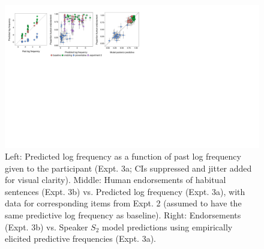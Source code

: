 \documentclass[10pt,letterpaper]{article}
\newcommand{\ndg}[1]{\textcolor{Green}{[ndg: #1]}}
\newcommand{\mht}[1]{\textcolor{DarkOrange}{[mht: #1]}}
\begin{document}



\begin{figure}[t]
\centering
  \includegraphics[width=\textwidth]{expt3-4-scatters-camera.pdf}
  \caption{Left: Predicted log frequency as a function of past log frequency given to the participant (Expt. 3a; CIs suppressed and jitter added for visual clarity).
  Middle: Human endorsements of habitual sentences (Expt. 3b) vs. Predicted log frequency (Expt. 3a), with data for corresponding items from Expt. 2 (assumed to have the same predictive log frequency as baseline). 
  Right: Endorsements (Expt. 3b) vs. Speaker $S_2$ model predictions using empirically elicited predictive frequencies (Expt. 3a).}
  \label{fig:tj3}
  \vspace{-7pt}
\end{figure}
\end{document}
